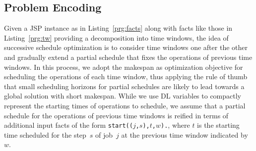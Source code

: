 \documentclass{tlp} %
\begin{document}

% 


\subsection{Problem Encoding}\label{subsec:encoding}

Given a JSP instance as in Listing~\ref{prg:facts} along with facts like those
in Listing~\ref{prg:tw} providing a decomposition into time windows,
the idea of successive schedule optimization is to consider time windows
one after the other and gradually extend a partial schedule that fixes the
operations of previous time windows.
In this process, we adopt the makespan as optimization objective for scheduling
the operations of each time window,
thus applying the rule of thumb that small scheduling horizons for
partial schedules are likely to lead towards a global solution with short makespan.
While we use DL variables to compactly represent the starting times of operations to schedule,
we assume that a partial schedule for the operations of previous time windows is reified
in terms of additional input facts of the form 
\lstinline{start((}$j$\lstinline{,}$s$\lstinline{),}$t$\lstinline{,}$w$\lstinline{).},
where $t$ is the starting time scheduled for the step~$s$ of job~$j$ at the previous
time window indicated by~$w$.
\end{document}
